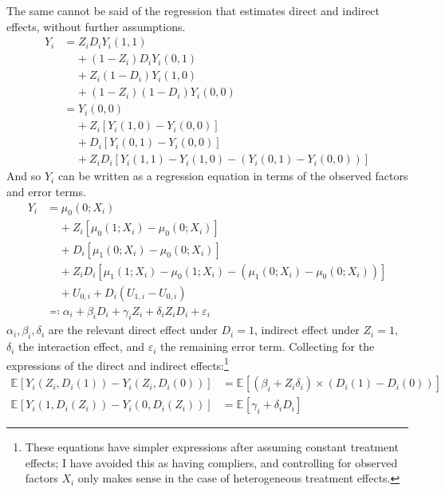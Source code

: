 \documentclass[a4paper, 12pt]{article}                                     %
\renewcommand{\vec}[1]{\boldsymbol{\mathit{#1}}}                           %
\newcommand{\E}[2][]{\mathbb{E}_{#1} \left[ #2 \right]}                    %
\begin{document}
The same cannot be said of the regression that estimates direct and indirect effects, without further assumptions.
\begin{align*}
    Y_i &= Z_i D_i Y_i(1, 1) \\
        & \;\;\;\; + (1 - Z_i) D_i Y_i(0, 1) \\
        & \;\;\;\; + Z_i (1 - D_i) Y_i(1, 0) \\
        & \;\;\;\; + (1 - Z_i) (1 - D_i) Y_i(0, 0) \\
        &= Y_i(0, 0) \\
        & \;\;\;\; + Z_i \left[Y_i(1, 0) - Y_i(0, 0) \right] \\
        & \;\;\;\; + D_i \left[Y_i(0, 1) - Y_i(0, 0) \right] \\
        & \;\;\;\; + Z_i D_i \left[Y_i(1, 1) - Y_i(1, 0)
            - \left( Y_i(0, 1) - Y_i(0, 0) \right)\right]
\end{align*}
And so $Y_i$ can be written as a regression equation in terms of the observed factors and error terms.
\begin{align*}
    Y_i &= \mu_0(0; \vec X_i) \\
        & \;\;\;\; + Z_i \left[\mu_0(1; \vec X_i) - \mu_0(0; \vec X_i) \right] \\
        & \;\;\;\; + D_i \left[\mu_1(0; \vec X_i) - \mu_0(0; \vec X_i) \right] \\
        & \;\;\;\; + Z_i D_i \left[\mu_1(1; \vec X_i) - \mu_0(1; \vec X_i)
            - \left( \mu_1(0; \vec X_i) - \mu_0(0; \vec X_i) \right)\right] \\
        & \;\;\;\; + U_{0,i} + D_i \left( U_{1,i} - U_{0,i} \right) \\
        &\eqqcolon
            \alpha_i + \beta_i D_i + \gamma_i Z_i + \delta_i Z_i D_i
            + \varepsilon_i
\end{align*}
$\alpha_i, \beta_i, \delta_i$ are the relevant direct effect under $D_i = 1$, indirect effect under $Z_i = 1$, $\delta_i$ the interaction effect, and $\varepsilon_i$ the remaining error term.
Collecting for the expressions of the direct and indirect effects:\footnote{
    These equations have simpler expressions after assuming constant treatment effects;
    I have avoided this as having compliers, and controlling for observed factors $\vec X_i$ only makes sense in the case of heterogeneous treatment effects.
}
\begin{align*}
    \E{Y_i(Z_i, D_i(1)) - Y_i(Z_i, D_i(0))}
        &= \E{\left( \beta_i +  Z_i \delta_i \right) \times
            \left(D_i(1) - D_i(0) \right)} \\
    \E{Y_i(1, D_i(Z_i)) - Y_i(0, D_i(Z_i))}
        &= \E{\gamma_i + \delta_i D_i}
\end{align*}
\end{document}
